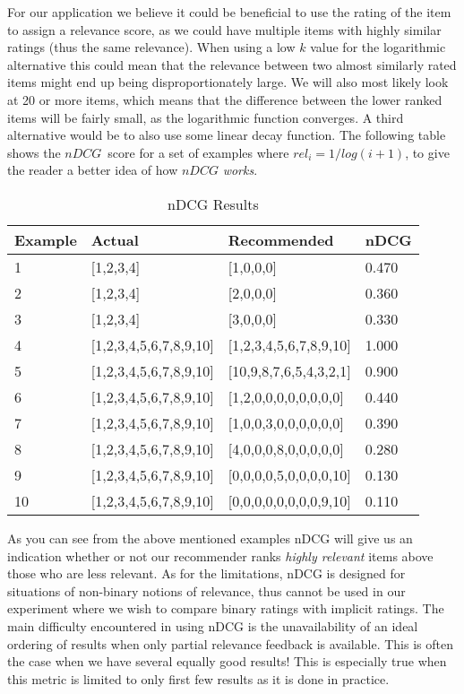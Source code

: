 For our application we believe it could be beneficial to use the rating of the item to assign a
relevance score, as we could have multiple items with highly similar ratings (thus the same relevance). When using a low $k$ value for the logarithmic alternative this could mean that the relevance between two almost similarly rated items might end up being disproportionately large. We will also most likely look at 20 or more items, which means that the difference between the lower ranked items will be fairly small, as the logarithmic function converges. A third alternative would be to also use some linear decay function. The following table shows the $nDCG$ score for a set of examples where $rel_i = 1/log(i+1)$, to give the reader a better idea of how $nDCG$ \emph{works}.

\begin{table}[H]
\label{table:ap}
\centering
\begin{tabular}{|l|l|l|l|}
\hline
Example 	& 	Actual					& 	Recommended				&	nDCG 	\\ \hline
1			& [1,2,3,4]					&	[1,0,0,0]				&	0.470   \\ \hline
2			& [1,2,3,4]					&	[2,0,0,0]				&	0.360   \\ \hline
3			& [1,2,3,4]					&	[3,0,0,0]				&	0.330   \\ \hline
4			& [1,2,3,4,5,6,7,8,9,10] 	& 	[1,2,3,4,5,6,7,8,9,10] 	&   1.000	\\ \hline
5			& [1,2,3,4,5,6,7,8,9,10] 	& 	[10,9,8,7,6,5,4,3,2,1] 	&   0.900	\\ \hline
6			& [1,2,3,4,5,6,7,8,9,10] 	& 	[1,2,0,0,0,0,0,0,0,0] 	&   0.440	\\ \hline
7			& [1,2,3,4,5,6,7,8,9,10] 	& 	[1,0,0,3,0,0,0,0,0,0] 	&   0.390	\\ \hline
8			& [1,2,3,4,5,6,7,8,9,10] 	& 	[4,0,0,0,8,0,0,0,0,0] 	&   0.280	\\ \hline
9			& [1,2,3,4,5,6,7,8,9,10] 	& 	[0,0,0,0,5,0,0,0,0,10] 	&   0.130	\\ \hline
10			& [1,2,3,4,5,6,7,8,9,10] 	& 	[0,0,0,0,0,0,0,0,9,10]	&   0.110	\\
\hline
\end{tabular}
\caption{nDCG Results}
\end{table}

As you can see from the above mentioned examples nDCG will give us an indication whether or not our recommender
ranks \emph{highly relevant} items above those who are less relevant. As for the limitations, nDCG is designed for situations of non-binary notions of relevance, thus cannot be used in our experiment where we wish to compare binary ratings with implicit ratings. The main difficulty encountered in using nDCG is the unavailability of an ideal ordering of results when only partial relevance feedback is available. This is often the case when we have several equally good results! This is especially true when this metric is limited to only first few results as it is done in practice.

